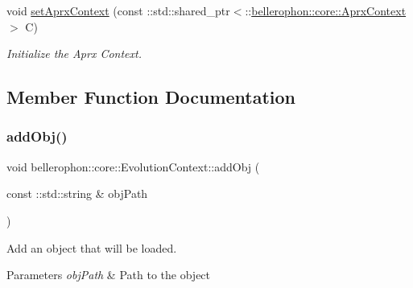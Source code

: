 \begin{DoxyCompactItemize}
\hypertarget{classbellerophon_1_1core_1_1EvolutionContext_a37196148355350b656ea458053a7f3be}{}\label{classbellerophon_1_1core_1_1EvolutionContext_a37196148355350b656ea458053a7f3be} 
void \hyperlink{classbellerophon_1_1core_1_1EvolutionContext_a37196148355350b656ea458053a7f3be}{set\+Aprx\+Context} (const \+::std\+::shared\+\_\+ptr$<$\+::\hyperlink{classbellerophon_1_1core_1_1AprxContext}{bellerophon\+::core\+::\+Aprx\+Context} $>$ C)
\begin{DoxyCompactList}\small\item\em Initialize the Aprx Context. \end{DoxyCompactList}\end{DoxyCompactItemize}


\subsection{Member Function Documentation}
\hypertarget{classbellerophon_1_1core_1_1EvolutionContext_a8ec4af08d2fa630cd1a6daa4e6400cc4}{}\label{classbellerophon_1_1core_1_1EvolutionContext_a8ec4af08d2fa630cd1a6daa4e6400cc4} 
\subsubsection{\texorpdfstring{add\+Obj()}{addObj()}}
{\footnotesize\ttfamily void bellerophon\+::core\+::\+Evolution\+Context\+::add\+Obj (\begin{DoxyParamCaption}\item[{const \+::std\+::string \&}]{obj\+Path }\end{DoxyParamCaption})\hspace{0.3cm}{\ttfamily [inline]}}



Add an object that will be loaded. 


\begin{DoxyParams}{Parameters}
{\em obj\+Path} & Path to the object \\
\hline
\end{DoxyParams}
\hypertarget{classbellerophon_1_1core_1_1EvolutionContext_aab5413234e99512ab0208539cf866a8a}{}\label{classbellerophon_1_1core_1_1EvolutionContext_aab5413234e99512ab0208539cf866a8a} 
